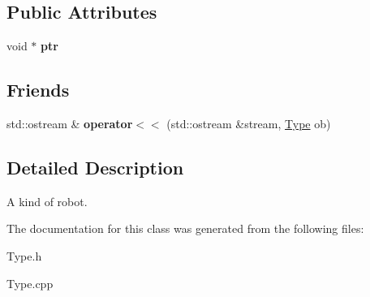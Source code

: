 \subsection*{Public Attributes}
\begin{DoxyCompactItemize}
\item 
\hypertarget{classType_a62e246f6d5c1198b48c0e2cac86983e2}{
void $\ast$ {\bfseries ptr}}
\label{classType_a62e246f6d5c1198b48c0e2cac86983e2}

\end{DoxyCompactItemize}
\subsection*{Friends}
\begin{DoxyCompactItemize}
\item 
\hypertarget{classType_a8f060939bf9f0486fb4f0c0cab2ebfda}{
std::ostream \& {\bfseries operator$<$$<$} (std::ostream \&stream, \hyperlink{classType}{Type} ob)}
\label{classType_a8f060939bf9f0486fb4f0c0cab2ebfda}

\end{DoxyCompactItemize}


\subsection{Detailed Description}
A kind of robot. 

The documentation for this class was generated from the following files:\begin{DoxyCompactItemize}
\item 
Type.h\item 
Type.cpp\end{DoxyCompactItemize}

